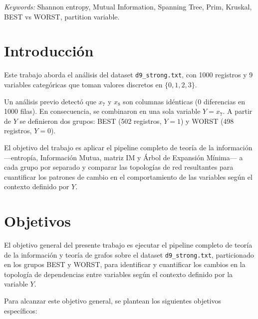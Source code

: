 \documentclass[12pt, a4paper]{article}
\begin{document}
\vspace{0.5cm}
\noindent\textit{Keywords:} Shannon entropy, Mutual Information, Spanning Tree,
Prim, Kruskal, BEST vs WORST, partition variable.

\newpage

\section{Introducción}

Este trabajo aborda el análisis del dataset \texttt{d9\_strong.txt}, con
1000 registros y 9 variables categóricas que toman valores discretos en
$\{0, 1, 2, 3\}$.

Un análisis previo detectó que $x_7$ y $x_8$ son columnas idénticas
(0 diferencias en 1000 filas). En consecuencia, se combinaron en una sola
variable $Y = x_7$. A partir de $Y$ se definieron dos grupos: BEST
(502 registros, $Y = 1$) y WORST (498 registros, $Y = 0$).

El objetivo del trabajo es aplicar el pipeline completo de teoría de la
información ---entropía, Información Mutua, matriz IM y Árbol de Expansión
Mínima--- a cada grupo por separado y comparar las topologías de red
resultantes para cuantificar los patrones de cambio en el comportamiento de
las variables según el contexto definido por $Y$.

\section{Objetivos}

El objetivo general del presente trabajo es ejecutar el pipeline completo
de teoría de la información y teoría de grafos sobre el dataset
\texttt{d9\_strong.txt}, particionado en los grupos BEST y WORST, para
identificar y cuantificar los cambios en la topología de dependencias
entre variables según el contexto definido por la variable $Y$.

Para alcanzar este objetivo general, se plantean los siguientes objetivos
específicos:
\end{document}
